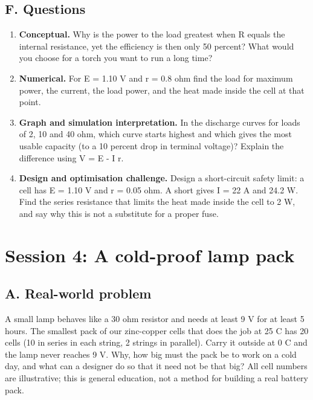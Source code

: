 \documentclass[11pt,a4paper]{article}
\begin{document}
\subsection*{F. Questions}
\begin{enumerate}[nosep]
\item \textbf{Conceptual.} Why is the power to the load greatest when R equals the internal resistance, yet the efficiency is then only 50 percent? What would you choose for a torch you want to run a long time?
\item \textbf{Numerical.} For E = 1.10 V and r = 0.8 ohm find the load for maximum power, the current, the load power, and the heat made inside the cell at that point.
\item \textbf{Graph and simulation interpretation.} In the discharge curves for loads of 2, 10 and 40 ohm, which curve starts highest and which gives the most usable capacity (to a 10 percent drop in terminal voltage)? Explain the difference using V = E - I r.
\item \textbf{Design and optimisation challenge.} Design a short-circuit safety limit: a cell has E = 1.10 V and r = 0.05 ohm. A short gives I = 22 A and 24.2 W. Find the series resistance that limits the heat made inside the cell to 2 W, and say why this is not a substitute for a proper fuse.
\end{enumerate}

\section{Session 4: A cold-proof lamp pack}

\subsection*{A. Real-world problem}
A small lamp behaves like a 30 ohm resistor and needs at least 9 V for at least 5 hours. The smallest pack of our zinc-copper cells that does the job at 25 C has 20 cells (10 in series in each string, 2 strings in parallel). Carry it outside at 0 C and the lamp never reaches 9 V. Why, how big must the pack be to work on a cold day, and what can a designer do so that it need not be that big? All cell numbers are illustrative; this is general education, not a method for building a real battery pack.
\end{document}
